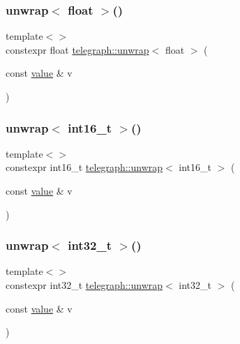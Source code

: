 \mbox{\label{namespacetelegraph_afb450fb07065bff298f2304d9cf5c087}} 
\subsubsection{\texorpdfstring{unwrap$<$ float $>$()}{unwrap< float >()}}
{\footnotesize\ttfamily template$<$$>$ \\
constexpr float \hyperlink{namespacetelegraph_ae06614be6a21deb7e0112a24d559f72c}{telegraph\+::unwrap}$<$ float $>$ (\begin{DoxyParamCaption}\item[{const \hyperlink{classtelegraph_1_1value}{value} \&}]{v }\end{DoxyParamCaption})}

\mbox{\label{namespacetelegraph_a6050960b7d95cc75c861451cac291222}} 
\subsubsection{\texorpdfstring{unwrap$<$ int16\+\_\+t $>$()}{unwrap< int16\_t >()}}
{\footnotesize\ttfamily template$<$$>$ \\
constexpr int16\+\_\+t \hyperlink{namespacetelegraph_ae06614be6a21deb7e0112a24d559f72c}{telegraph\+::unwrap}$<$ int16\+\_\+t $>$ (\begin{DoxyParamCaption}\item[{const \hyperlink{classtelegraph_1_1value}{value} \&}]{v }\end{DoxyParamCaption})}

\mbox{\label{namespacetelegraph_adbd7808475a7100a0b36ac829ffed4bf}} 
\subsubsection{\texorpdfstring{unwrap$<$ int32\+\_\+t $>$()}{unwrap< int32\_t >()}}
{\footnotesize\ttfamily template$<$$>$ \\
constexpr int32\+\_\+t \hyperlink{namespacetelegraph_ae06614be6a21deb7e0112a24d559f72c}{telegraph\+::unwrap}$<$ int32\+\_\+t $>$ (\begin{DoxyParamCaption}\item[{const \hyperlink{classtelegraph_1_1value}{value} \&}]{v }\end{DoxyParamCaption})}

